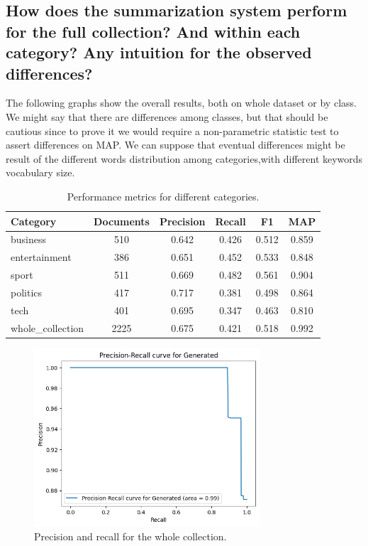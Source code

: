 \newpage
\subsection{How does the summarization system perform for the full collection? And within each category? Any intuition for the observed differences?}
The following graphs show the overall results, both on whole dataset or by class. \\
We might say that there are differences among classes, but that should be cautious since to prove it we would require a non-parametric statistic test to assert differences on MAP. We can suppose that eventual differences might be result of the different words distribution among categories,with different keywords vocabulary size. 

\begin{center}
    \begin{table}[H]
        \centering
        \begin{tabular}{|l|c|c|c|c|c|}
            \hline
            Category          & Documents & Precision & Recall & F1    & MAP   \\
            \hline
            business          & 510       & 0.642     & 0.426  & 0.512 & 0.859 \\
            entertainment     & 386       & 0.651     & 0.452  & 0.533 & 0.848 \\
            sport             & 511       & 0.669     & 0.482  & 0.561 & 0.904 \\
            politics          & 417       & 0.717     & 0.381  & 0.498 & 0.864 \\
            tech              & 401       & 0.695     & 0.347  & 0.463 & 0.810 \\
            \hline
            whole\_collection & 2225      & 0.675     & 0.421  & 0.518 & 0.992 \\
            \hline
        \end{tabular}
        \caption{Performance metrics for different categories.}
        \label{tab:performance}
    \end{table}
\end{center}

\begin{figure}[H]
    \centering
    \includegraphics[width=0.75\textwidth]{images/whole_collection_performance.png}
    \caption{Precision and recall for the whole collection.}
    \label{fig:Performances_whole}
\end{figure}


